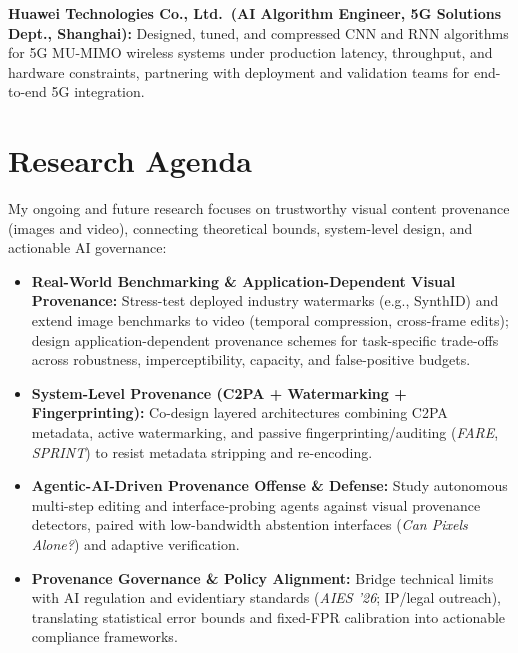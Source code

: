 \documentclass[10pt,a4paper]{article}
\begin{document}
\vspace{2.4pt}
\textbf{Huawei Technologies Co., Ltd.\ (AI Algorithm Engineer, 5G Solutions Dept.\@, Shanghai):} Designed, tuned, and compressed CNN and RNN algorithms for 5G MU-MIMO wireless systems under production latency, throughput, and hardware constraints, partnering with deployment and validation teams for end-to-end 5G integration.

\newpage
\linespread{1.11}\selectfont
\titlespacing*{\section}{0pt}{13.0pt}{5.2pt}

\section*{Research Agenda}
My ongoing and future research focuses on trustworthy visual content provenance (images and video), connecting theoretical bounds, system-level design, and actionable AI governance:
\begin{itemize}[itemsep=3.2pt]
  \item \textbf{Real-World Benchmarking \& Application-Dependent Visual Provenance:} Stress-test deployed industry watermarks (e.g., \mbox{SynthID}) and extend image benchmarks to video (temporal compression, cross-frame edits); design application-dependent provenance schemes for task-specific trade-offs across robustness, imperceptibility, capacity, and false-positive budgets.
  \item \textbf{System-Level Provenance (C2PA + Watermarking + Fingerprinting):} Co-design layered architectures combining C2PA metadata, active watermarking, and passive fingerprinting/auditing (\textit{FARE}, \textit{SPRINT}) to resist metadata stripping and re-encoding.
  \item \textbf{Agentic-AI-Driven Provenance Offense \& Defense:} Study autonomous multi-step editing and interface-probing agents against visual provenance detectors, paired with low-bandwidth abstention interfaces (\textit{Can Pixels Alone?}) and adaptive verification.
  \item \textbf{Provenance Governance \& Policy Alignment:} Bridge technical limits with AI regulation and evidentiary standards (\textit{AIES '26}; IP/legal outreach), translating statistical error bounds and fixed-FPR calibration into actionable compliance frameworks.
\end{itemize}
\end{document}
